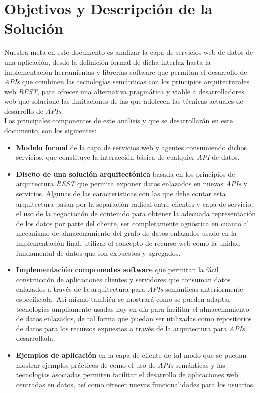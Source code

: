 \chapter{Objetivos y Descripci\'on de la Soluci\'on}

Nuestra meta en este documento es analizar la capa de servicios web de datos de una aplicaci\'on, desde la definici\'on formal de dicha interfaz hasta la implementaci\'on herramientas y librer\'ias software que permitan el desarrollo de \textit{APIs} que combinen las tecnolog\'ias sem\'anticas con los principios arquitecturales web \textit{REST}, para ofrecer una alternativa pragm\'atica y viable a desarrolladores web que solucione las limitaciones de las que adolecen las t\'ecnicas actuales de desarrollo de \textit{APIs}.\\
Los principales componentes de este an\'alisis y que se desarrollar\'an en este documento, son los siguientes:\\

\begin{itemize}

\item \textbf{Modelo formal} de la capa de servicios web y agentes consumiendo dichos servicios, que constituye la interacci\'on b\'asica de cualquier \textit{API} de datos.

\item \textbf{Dise\~no de una soluci\'on arquitect\'onica} basada en los principios de arquitectura \textit{REST} que permita exponer datos enlazados en nuevas \textit{APIs} y servicios. Algunas de las caracter\'isticas con las que debe contar esta arquitectura pasan por la separaci\'on radical entre clientes y capa de servicio, el uso de la negociaci\'on de contenido para obtener la adecuada representaci\'on de los datos por parte del cliente, ser completamente agn\'ostica en cuanto al mecanismo  de almacenamiento del grafo de datos enlazados usado en la implementaci\'on final, utilizar el concepto de recurso web como la unidad fundamental de datos que son expuestos y agregados.

\item \textbf{Implementaci\'on componentes software} que permitan la f\'acil construcci\'on de aplicaciones clientes y servidores que consuman datos enlazados a trav\'es de la arquitectura para \textit{APIs} sem\'anticas anteriormente especificada. As\'i mismo tambi\'en se mostrar\'a como se pueden adaptar tecnolog\'ias  ampliamente usadas hoy en d\'ia para facilitar el almacenamiento de datos enlazados, de tal forma que puedan ser utilizadas como repositorios de datos para los recursos expuestos a trav\'es de la arquitectura para \textit{APIs} desarrollada.

\item \textbf{Ejemplos de aplicaci\'on} en la capa de cliente de tal modo que se puedan mostrar ejemplos pr\'acticos de como el uso de \textit{APIs} sem\'anticas y las tecnolog\'ias asociadas permiten facilitar el desarrollo de aplicaciones web centradas en datos, as\'i como ofrecer nuevas funcionalidades para los usuarios.

\end{itemize}


